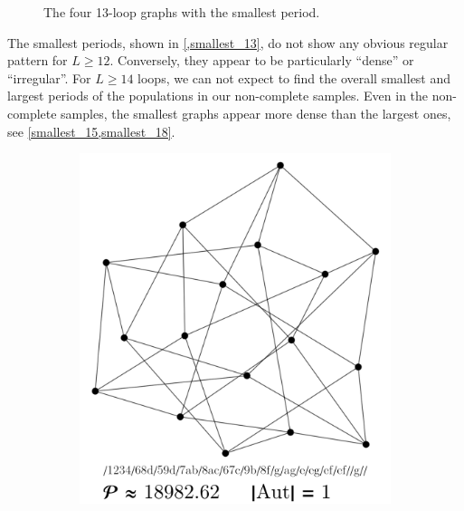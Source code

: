 \documentclass[12pt,a4paper]{article}
\renewcommand{\|}{\rule[-0.4ex]{0.2ex}{1.2em}}
\begin{document}
\begin{figure}[htb]
	\caption{The four 13-loop graphs with the smallest period.}
	\label{smallest_13}
\end{figure}

The smallest periods, shown in \cref{,smallest_13}, do not show any obvious regular pattern for $L \geq 12$. Conversely, they appear to be particularly \enquote{dense} or \enquote{irregular}. 
For $L\geq 14$ loops,  we can not expect to find the overall smallest and largest periods of the populations in our non-complete samples.
Even in the non-complete samples, the smallest graphs  appear more dense than the largest ones, see \cref{smallest_15,smallest_18}.


\begin{figure}[htb]
	\begin{subfigure}[b]{.24 \textwidth}
		\includegraphics[width=\linewidth]{smallest_15_1}
		\subcaption{}
	\end{subfigure}
	\begin{subfigure}[b]{.24 \textwidth}

\end{subfigure}
\end{figure}
\end{document}
